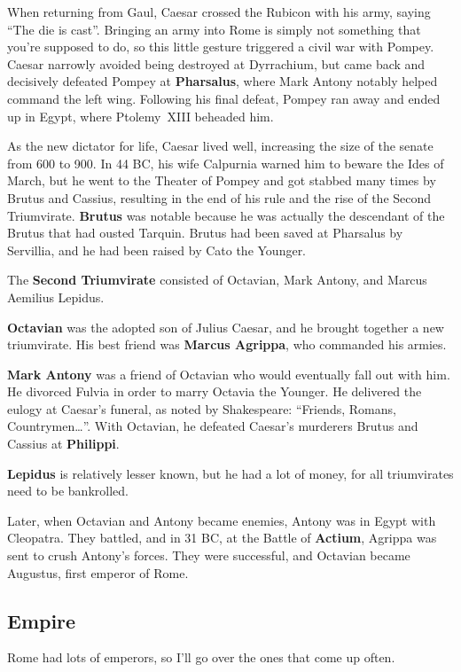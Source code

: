 When returning from Gaul, Caesar crossed the Rubicon with his army, saying ``The die is cast''.
Bringing an army into Rome is simply not something that you're supposed to do,
so this little gesture triggered a civil war with Pompey.
Caesar narrowly avoided being destroyed at Dyrrachium,
but came back and decisively defeated Pompey at \textbf{Pharsalus},
where Mark Antony notably helped command the left wing.
Following his final defeat, Pompey ran away and ended up in Egypt, where Ptolemy~XIII beheaded him.

As the new dictator for life, Caesar lived well, increasing the size of the senate from 600 to 900.
In 44 BC, his wife Calpurnia warned him to beware the Ides of March,
but he went to the Theater of Pompey and got stabbed many times by Brutus and Cassius,
resulting in the end of his rule and the rise of the Second Triumvirate.
\textbf{Brutus} was notable because he was actually the descendant of the Brutus that had ousted Tarquin.
Brutus had been saved at Pharsalus by Servillia, and he had been raised by Cato the Younger.

The \textbf{Second Triumvirate} consisted of Octavian, Mark Antony, and Marcus Aemilius Lepidus.

\textbf{Octavian} was the adopted son of Julius Caesar, and he brought together a new triumvirate.
His best friend was \textbf{Marcus Agrippa}, who commanded his armies.

\textbf{Mark Antony} was a friend of Octavian who would eventually fall out with him.
He divorced Fulvia in order to marry Octavia the Younger.
He delivered the eulogy at Caesar's funeral, as noted by Shakespeare:
``Friends, Romans, Countrymen\ldots{}''.
With Octavian, he defeated Caesar's murderers Brutus and Cassius at \textbf{Philippi}.

\textbf{Lepidus} is relatively lesser known, but he had a lot of money,
for all triumvirates need to be bankrolled.

Later, when Octavian and Antony became enemies, Antony was in Egypt with Cleopatra.
They battled, and in 31 BC, at the Battle of \textbf{Actium}, Agrippa was sent to crush Antony's forces.
They were successful, and Octavian became Augustus, first emperor of Rome.

\subsection*{Empire}

Rome had lots of emperors, so I'll go over the ones that come up often.

